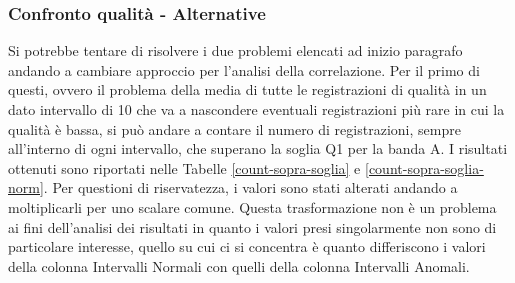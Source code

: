 \begin{table}[H]
	\begin{minipage}{.5\textwidth}
		\centering
		\label{mvm-confusion1}
	\end{minipage}
	\begin{minipage}{.5\textwidth}
		\centering
		\label{mvm-confusion2}
	\end{minipage}
\end{table}


\subsubsection{Confronto qualità - Alternative}
Si potrebbe tentare di risolvere i due problemi elencati ad inizio paragrafo andando a cambiare approccio per l'analisi della correlazione.
Per il primo di questi, ovvero il problema della media di tutte le registrazioni di qualità in un dato intervallo di 10 che va a nascondere eventuali registrazioni più rare in cui la qualità è bassa, si può andare a contare il numero di registrazioni, sempre all'interno di ogni intervallo, che superano la soglia Q1 per la banda A.
I risultati ottenuti sono riportati nelle Tabelle \ref{count-sopra-soglia} e \ref{count-sopra-soglia-norm}. Per questioni di riservatezza, i valori sono stati alterati andando a moltiplicarli per uno scalare comune. 
Questa trasformazione non è un problema ai fini dell'analisi dei risultati in quanto i valori presi singolarmente non sono di particolare interesse, quello su cui ci si concentra è quanto differiscono i valori della colonna Intervalli Normali con quelli della colonna Intervalli Anomali.



